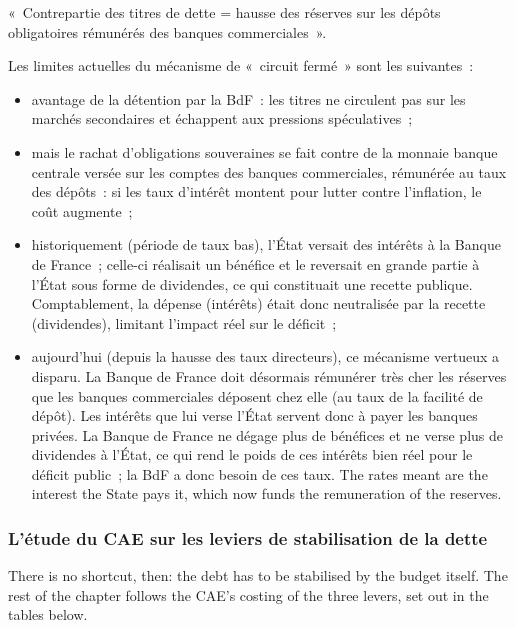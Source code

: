 \begin{remark}
  «~Contrepartie des titres de dette = hausse des réserves sur les dépôts
  obligatoires rémunérés des banques commerciales~».
\end{remark}

Les limites actuelles du mécanisme de «~circuit fermé~» sont les suivantes~:
\begin{itemize}
  \item avantage de la détention par la BdF~: les titres ne circulent pas sur les
    marchés secondaires et échappent aux pressions spéculatives~;
  \item mais le rachat d'obligations souveraines se fait contre de la monnaie
    banque centrale versée sur les comptes des banques commerciales, rémunérée au
    taux des dépôts~: si les taux d'intérêt montent pour lutter contre
    l'inflation, le coût augmente~;
  \item historiquement (période de taux bas), l'État versait des intérêts à la
    Banque de France~; celle-ci réalisait un bénéfice et le reversait en grande
    partie à l'État sous forme de dividendes, ce qui constituait une recette
    publique. Comptablement, la dépense (intérêts) était donc neutralisée par la
    recette (dividendes), limitant l'impact réel sur le déficit~;
  \item aujourd'hui (depuis la hausse des taux directeurs), ce mécanisme vertueux
    a disparu. La Banque de France doit désormais rémunérer très cher les
    réserves que les banques commerciales déposent chez elle (au taux de la
    facilité de dépôt). Les intérêts que lui verse l'État servent donc à payer
    les banques privées. La Banque de France ne dégage plus de bénéfices et ne
    verse plus de dividendes à l'État, ce qui rend le poids de ces intérêts bien
    réel pour le déficit public~; la BdF a donc besoin de ces taux. The rates
    meant are the interest the State pays it, which now funds the remuneration
    of the reserves.
\end{itemize}

\subsubsection{L'étude du CAE sur les leviers de stabilisation de la dette}

There is no shortcut, then: the debt has to be stabilised by the budget itself.
The rest of the chapter follows the CAE's costing of the three levers, set out
in the tables below.

